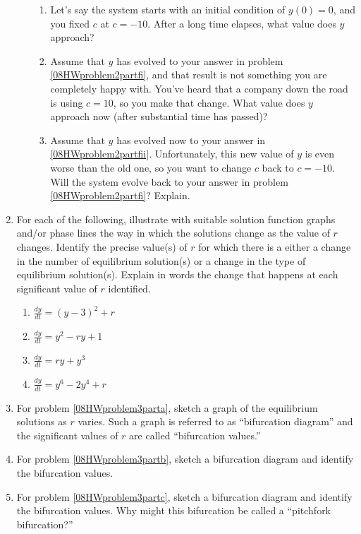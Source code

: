 \begin{enumerate}
\begin{enumerate}
\begin{enumerate}
\item Let's say the system starts with an initial condition of $y(0) = 0$, and you fixed $c$ at $c = -10$. After a long time elapses, what value does $y$ approach? \label{08HWproblem2partfi}
\item Assume that $y$ has evolved to your answer in problem \ref{08HWproblem2partfi}, and that result is not something you are completely happy with. You've heard that a company down the road is using $c = 10$, so you make that change. What value does $y$ approach now (after substantial time has passed)? \label{08HWproblem2partfii}
\item Assume that $y$ has evolved now to your answer in \ref{08HWproblem2partfii}. Unfortunately, this new value of $y$ is even worse than the old one, so you want to change $c$ back to $c = -10$. Will the system evolve back to your answer in problem \ref{08HWproblem2partfi}? Explain. \label{08HWproblem2partfiii}
\end{enumerate}
\end{enumerate}

\item For each of the following, illustrate with suitable solution function graphs and/or phase lines the way in which the solutions change as the value of $r$ changes. Identify the precise value(s) of $r$ for which there is a either a change in the number of equilibrium solution(s) or a change in the type of equilibrium solution(s). Explain in words the change that happens at each significant value of $r$ identified. 

\begin{enumerate}
\item $\displaystyle \frac{dy}{dt}=(y-3)^2+r$ \label{08HWproblem3parta}
\item $\displaystyle \frac{dy}{dt}=y^2-ry+1$ \label{08HWproblem3partb}
\item $\displaystyle \frac{dy}{dt}=ry+y^3$ \label{08HWproblem3partc}
\item $\displaystyle \frac{dy}{dt}=y^6-2y^4+r$ \label{08HWproblem3partd}
\end{enumerate}

\item For problem \ref{08HWproblem3parta}, sketch a graph of the equilibrium solutions as $r$ varies. Such a graph is referred to as ``bifurcation diagram'' and the significant values of $r$ are called ``bifurcation values.'' \label{08HWproblem4}
\item For problem \ref{08HWproblem3partb}, sketch a bifurcation diagram and identify the bifurcation values. \label{08HWproblem5}
\item For problem \ref{08HWproblem3partc}, sketch a bifurcation diagram and identify the bifurcation values. Why might this bifurcation be called a ``pitchfork bifurcation?'' \label{08HWproblem6}
\end{enumerate}



